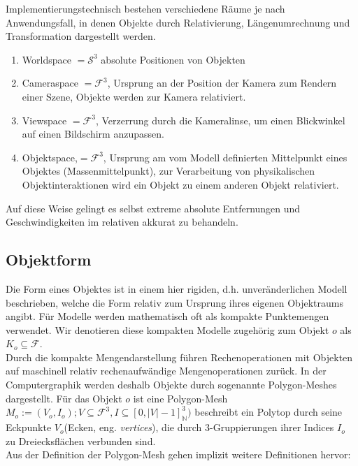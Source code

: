 Implementierungstechnisch bestehen verschiedene Räume je nach Anwendungsfall, in denen Objekte durch Relativierung, Längenumrechnung und Transformation dargestellt werden.

\begin{enumerate}
\item Worldspace $= \mathcal{S}^3$ absolute Positionen von Objekten
\item Cameraspace $= \mathcal{F}^3$, Ursprung an der Position der Kamera zum Rendern einer Szene, Objekte werden zur Kamera relativiert.
\item Viewspace $= \mathcal{F}^3$, Verzerrung durch die Kameralinse, um einen Blickwinkel auf einen Bildschirm anzupassen.
\item Objektspace,$= \mathcal{F}^3$, Ursprung am vom Modell definierten Mittelpunkt eines Objektes (Massenmittelpunkt), zur Verarbeitung von physikalischen Objektinteraktionen wird ein Objekt zu einem anderen Objekt relativiert.
\end{enumerate}

Auf diese Weise gelingt es selbst extreme absolute Entfernungen und Geschwindigkeiten im relativen akkurat zu behandeln.

\subsection{Objektform}
\label{object_form}
Die Form eines Objektes ist in einem hier rigiden, d.h. unveränderlichen Modell beschrieben, welche die Form relativ zum Ursprung ihres eigenen Objektraums angibt.
Für Modelle werden mathematisch oft als kompakte Punktemengen verwendet. Wir denotieren diese kompakten Modelle zugehörig zum Objekt $o$ als $ K_o \subseteq \mathcal{F}$.\\

Durch die kompakte Mengendarstellung führen Rechenoperationen mit Objekten auf maschinell relativ rechenaufwändige Mengenoperationen zurück. In der Computergraphik werden deshalb Objekte durch sogenannte Polygon-Meshes dargestellt. 
Für das Objekt $o$ ist eine Polygon-Mesh $M_o := (V_o, I_o); V \subseteq \mathcal{F}^3, I \subseteq [0, |V|-1]_\mathbb{N}^3 )$ beschreibt ein Polytop durch seine Eckpunkte $V_o$(Ecken, eng. \textit{vertices}), die durch 3-Gruppierungen ihrer Indices $I_o$ zu Dreiecksflächen verbunden sind.\\
Aus der Definition der Polygon-Mesh gehen implizit weitere Definitionen hervor:

